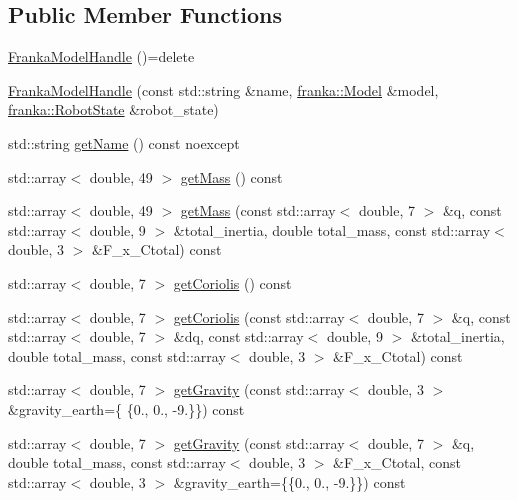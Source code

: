 \subsection*{Public Member Functions}
\begin{DoxyCompactItemize}
\item 
\hyperlink{classfranka__hw_1_1FrankaModelHandle_ac334b1156574e6a4b1d4128cc23af6af}{Franka\+Model\+Handle} ()=delete
\item 
\hyperlink{classfranka__hw_1_1FrankaModelHandle_a814fbbc91e975d22ebd6e156e52944bd}{Franka\+Model\+Handle} (const std\+::string \&name, \hyperlink{classfranka_1_1Model}{franka\+::\+Model} \&model, \hyperlink{structfranka_1_1RobotState}{franka\+::\+Robot\+State} \&robot\+\_\+state)
\item 
std\+::string \hyperlink{classfranka__hw_1_1FrankaModelHandle_a88f37f3c1fe73ce7aa9460809847b416}{get\+Name} () const noexcept
\item 
std\+::array$<$ double, 49 $>$ \hyperlink{classfranka__hw_1_1FrankaModelHandle_a252d6872afa722e55d2a9cba4ac42088}{get\+Mass} () const
\item 
std\+::array$<$ double, 49 $>$ \hyperlink{classfranka__hw_1_1FrankaModelHandle_a72d3355fbea921d7c6fbef17062b69a6}{get\+Mass} (const std\+::array$<$ double, 7 $>$ \&q, const std\+::array$<$ double, 9 $>$ \&total\+\_\+inertia, double total\+\_\+mass, const std\+::array$<$ double, 3 $>$ \&F\+\_\+x\+\_\+\+Ctotal) const
\item 
std\+::array$<$ double, 7 $>$ \hyperlink{classfranka__hw_1_1FrankaModelHandle_a8464b57e4652399c19c8abf2a426eebe}{get\+Coriolis} () const
\item 
std\+::array$<$ double, 7 $>$ \hyperlink{classfranka__hw_1_1FrankaModelHandle_aa503a5006467f3fd48140a296362e1d1}{get\+Coriolis} (const std\+::array$<$ double, 7 $>$ \&q, const std\+::array$<$ double, 7 $>$ \&dq, const std\+::array$<$ double, 9 $>$ \&total\+\_\+inertia, double total\+\_\+mass, const std\+::array$<$ double, 3 $>$ \&F\+\_\+x\+\_\+\+Ctotal) const
\item 
std\+::array$<$ double, 7 $>$ \hyperlink{classfranka__hw_1_1FrankaModelHandle_ac6ad04268fd86d0442733000025c2230}{get\+Gravity} (const std\+::array$<$ double, 3 $>$ \&gravity\+\_\+earth=\{ \{0., 0., -\/9.\}\}) const
\item 
std\+::array$<$ double, 7 $>$ \hyperlink{classfranka__hw_1_1FrankaModelHandle_a832505472a8e7bc9e12f26a57eb659f8}{get\+Gravity} (const std\+::array$<$ double, 7 $>$ \&q, double total\+\_\+mass, const std\+::array$<$ double, 3 $>$ \&F\+\_\+x\+\_\+\+Ctotal, const std\+::array$<$ double, 3 $>$ \&gravity\+\_\+earth=\{\{0., 0., -\/9.\}\}) const

\end{DoxyCompactItemize}
